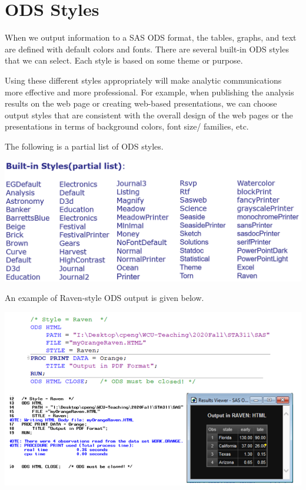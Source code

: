 \documentclass[
]{book}
\begin{document}
\hypertarget{ods-styles}{%
\section{ODS Styles}\label{ods-styles}}

When we output information to a SAS ODS format, the tables, graphs, and text are defined with default colors and fonts. There are several built-in ODS styles that we can select. Each style is based on some theme or purpose.

Using these different styles appropriately will make analytic communications more effective and more professional. For example, when publishing the analysis results on the web page or creating web-based presentations, we can choose output styles that are consistent with the overall design of the web pages or the presentations in terms of background colors, font size/ families, etc.

The following is a partial list of ODS styles.

\begin{center}\includegraphics[width=1\linewidth]{img12/w12-built-in-styles} \end{center}

An example of Raven-style ODS output is given below.

\begin{center}\includegraphics[width=1\linewidth]{img12/w12-ODS-Raven-style} \end{center}
\end{document}

